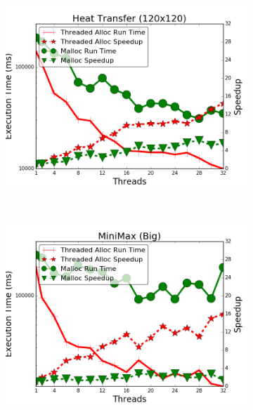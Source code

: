 \begin{figure}[h]
        ~
        \begin{subfigure}[b]{\smallplotsize\textwidth}
                \includegraphics[width=\textwidth]{experiments/scalability/malloc-allocator-new-heat-transfer-120.png}
                \label{fig:implementation:malloc_ht}
        \end{subfigure}
        ~
        \begin{subfigure}[b]{\smallplotsize\textwidth}
                \includegraphics[width=\textwidth]{experiments/scalability/malloc-allocator-min-max-tictactoe-big.png}
                \label{fig:implementation:malloc_minimax}
        \end{subfigure}
        ~
        \begin{subfigure}[b]{\smallplotsize\textwidth}

\end{subfigure}
\end{figure}
